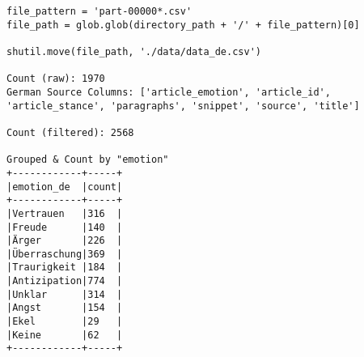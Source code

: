 \begin{verbatim}
file_pattern = 'part-00000*.csv'
file_path = glob.glob(directory_path + '/' + file_pattern)[0]

shutil.move(file_path, './data/data_de.csv')

Count (raw): 1970
German Source Columns: ['article_emotion', 'article_id', 'article_stance', 'paragraphs', 'snippet', 'source', 'title']

Count (filtered): 2568

Grouped & Count by "emotion"
+------------+-----+
|emotion_de  |count|
+------------+-----+
|Vertrauen   |316  |
|Freude      |140  |
|Ärger       |226  |
|Überraschung|369  |
|Traurigkeit |184  |
|Antizipation|774  |
|Unklar      |314  |
|Angst       |154  |
|Ekel        |29   |
|Keine       |62   |
+------------+-----+
\end{verbatim}
\clearpage


